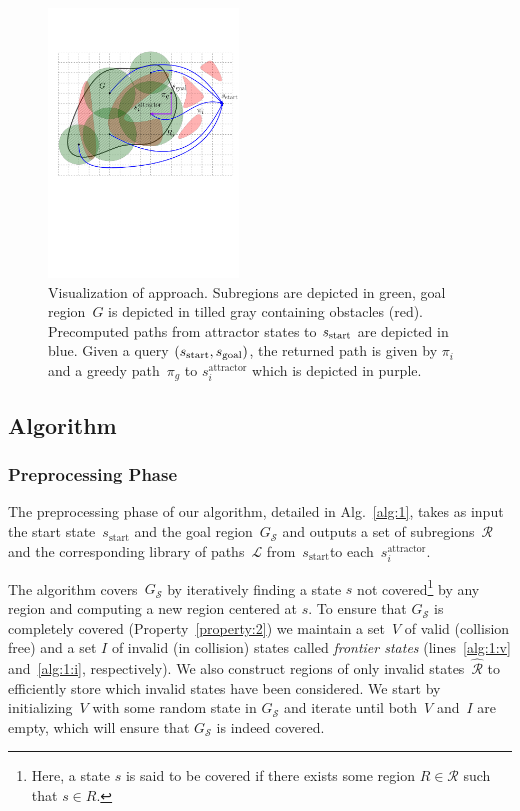 \documentclass[letterpaper]{article} %
\newcommand{\calL}{\ensuremath{\mathcal{L}}\xspace}
\newcommand{\calS}{\ensuremath{\mathcal{S}}\xspace}
\newcommand{\calR}{\ensuremath{\mathcal{R}}\xspace}
\newcommand{\sAttract}{\ensuremath{s^{\text{attractor}}_i}\xspace}
\newcommand{\sStart}{\ensuremath{s_{\text{start}}\xspace}}
\begin{document}
\begin{figure}
\centering
\includegraphics[width=0.45\textwidth]{Approach-new.pdf}
  \caption{
  Visualization of approach. Subregions are depicted in green, 
  goal region~$G$ is depicted in tilled gray  containing obstacles (red).
  Precomputed paths from attractor states to $s_{\rm{start}}$ are depicted in blue.
 Given a query $(s_{\rm{start}}, s_{\rm{goal}})$, the returned path is given by $\pi_i$ and a greedy path~$\pi_g$ to \sAttract which is depicted in purple. 
}
   	\label{fig:approach}
\end{figure}

\subsection {Algorithm}
\label{subsec:alg}
\subsubsection{Preprocessing Phase}
The preprocessing phase of our algorithm, detailed in Alg.~\ref{alg:1}, takes as input the start state~$\sStart$ and the goal region~$G_\calS$ and outputs a set of subregions~$\calR$ and the corresponding library of paths~$\calL$ from~\sStart to each~\sAttract. 

The algorithm covers~$G_\calS$ by iteratively finding a state $s$ not covered\footnote{Here, a state $s$ is said to be covered if there exists some region $R \in \calR$ such that $s \in R$.} by any region and computing a new region centered at $s$.
To ensure that $G_\calS$ is completely covered (Property~\ref{property:2}) we maintain a set~$V$ of valid (collision free) and a set $I$ of invalid (in collision) states called \emph{frontier states} (lines~\ref{alg:1:v} and~\ref{alg:1:i}, respectively).
We also construct regions of only invalid states~$\hat{\calR}$ to efficiently store which invalid states have been considered.
We start by initializing~$V$ with some random state in $G_\calS$ and iterate until both~$V$ and~$I$ are empty, which will ensure that $G_\calS$ is indeed covered.
\end{document}
